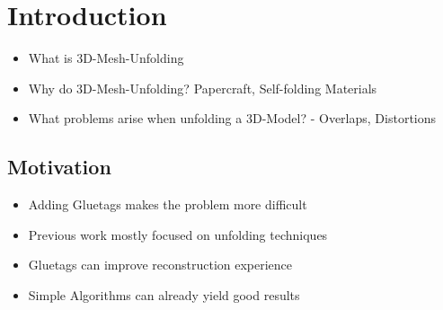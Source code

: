 \documentclass[draft,final]{vutinfth} %
\begin{document}
\frontmatter %

\addstatementpage

\begin{danksagung*}
\end{danksagung*}

\begin{acknowledgements*}
\end{acknowledgements*}

\begin{kurzfassung}
\end{kurzfassung}

\begin{abstract}
\end{abstract}


\tableofcontents %

\mainmatter

\chapter{Introduction}

\begin{itemize}
	\item What is 3D-Mesh-Unfolding
	\item Why do 3D-Mesh-Unfolding? Papercraft, Self-folding Materials
	\item What problems arise when unfolding a 3D-Model? - Overlaps, Distortions
\end{itemize}

\section{Motivation}

\begin{itemize}
	\item Adding Gluetags makes the problem more difficult
	\item Previous work mostly focused on unfolding techniques
	\item Gluetags can improve reconstruction experience
	\item Simple Algorithms can already yield good results
\end{itemize}
\end{document}
